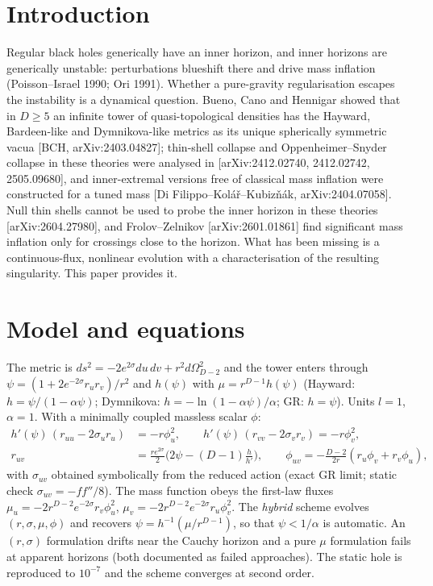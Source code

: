 \documentclass[11pt,a4paper]{article}
\theoremstyle{remark}\newtheorem{remark}[theorem]{Remark}
\begin{document}
\section{Introduction}
Regular black holes generically have an inner horizon, and inner horizons are generically unstable: perturbations blueshift there and
drive mass inflation (Poisson--Israel 1990; Ori 1991). Whether a pure-gravity regularisation escapes the instability is a dynamical
question. Bueno, Cano and Hennigar showed that in $D\ge5$ an infinite tower of quasi-topological densities has the Hayward,
Bardeen-like and Dymnikova-like metrics as its unique spherically symmetric vacua [BCH, arXiv:2403.04827]; thin-shell collapse and
Oppenheimer--Snyder collapse in these theories were analysed in [arXiv:2412.02740, 2412.02742, 2505.09680], and inner-extremal
versions free of classical mass inflation were constructed for a tuned mass [Di Filippo--Kol\'a\v{r}--Kubiz\v{n}\'ak, arXiv:2404.07058].
Null thin shells cannot be used to probe the inner horizon in these theories [arXiv:2604.27980], and Frolov--Zelnikov
[arXiv:2601.01861] find significant mass inflation only for crossings close to the horizon. What has been missing is a continuous-flux,
nonlinear evolution with a characterisation of the resulting singularity. This paper provides it.

\section{Model and equations}
The metric is $ds^2=-2e^{2\sigma}du\,dv+r^2d\Omega_{D-2}^2$ and the tower enters through
$\psi=(1+2e^{-2\sigma}r_ur_v)/r^2$ and $h(\psi)$ with $\mu=r^{D-1}h(\psi)$ (Hayward: $h=\psi/(1-\alpha\psi)$; Dymnikova:
$h=-\ln(1-\alpha\psi)/\alpha$; GR: $h=\psi$). Units $l=1$, $\alpha=1$. With a minimally coupled massless scalar $\phi$:
\begin{align}
h'(\psi)\,(r_{uu}-2\sigma_ur_u)&=-r\phi_u^2,\qquad h'(\psi)\,(r_{vv}-2\sigma_vr_v)=-r\phi_v^2,\\
r_{uv}&=\tfrac{r e^{2\sigma}}{2}\Big(2\psi-(D-1)\frac{h}{h'}\Big),\qquad
\phi_{uv}=-\frac{D-2}{2r}(r_u\phi_v+r_v\phi_u),
\end{align}
with $\sigma_{uv}$ obtained symbolically from the reduced action (exact GR limit; static check $\sigma_{uv}=-ff''/8$). The mass function
obeys the first-law fluxes $\mu_u=-2r^{D-2}e^{-2\sigma}r_v\phi_u^2$, $\mu_v=-2r^{D-2}e^{-2\sigma}r_u\phi_v^2$. The \emph{hybrid} scheme
evolves $(r,\sigma,\mu,\phi)$ and recovers $\psi=h^{-1}(\mu/r^{D-1})$, so that $\psi<1/\alpha$ is automatic. An $(r,\sigma)$ formulation
drifts near the Cauchy horizon and a pure $\mu$ formulation fails at apparent horizons (both documented as failed approaches).
The static hole is reproduced to $10^{-7}$ and the scheme converges at second order.
\end{document}
